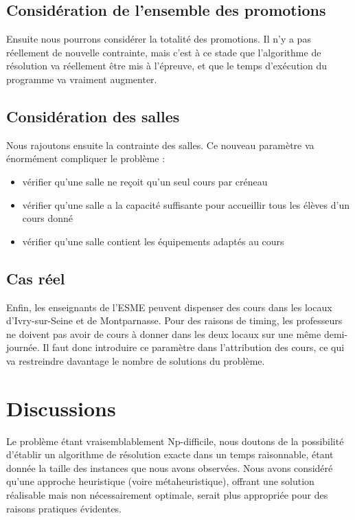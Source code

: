 \documentclass[12pt,a4paper,french]{article}
\begin{document}
\subsection{Considération de l'ensemble des promotions}
Ensuite nous pourrons considérer la totalité des promotions. Il n'y a pas réellement de nouvelle contrainte, mais c'est à ce stade que l'algorithme de résolution va réellement être mis à l'épreuve, et que le temps d'exécution du programme va vraiment augmenter.

\subsection{Considération des salles}
Nous rajoutons ensuite la contrainte des salles. Ce nouveau paramètre va énormément compliquer le problème :
\begin{itemize}
\item vérifier qu'une salle ne reçoit qu'un seul cours par créneau
\item vérifier qu'une salle a la capacité suffisante pour accueillir tous les élèves d'un cours donné
\item vérifier qu'une salle contient les équipements adaptés au cours
\end{itemize}

\subsection{Cas réel}
Enfin, les enseignants de l'ESME peuvent dispenser des cours dans les locaux d'Ivry-sur-Seine et de Montparnasse. Pour des raisons de timing, les professeurs ne doivent pas avoir de cours à donner dans les deux locaux sur une même demi-journée. Il faut donc introduire ce paramètre dans l'attribution des cours, ce qui va restreindre davantage le nombre de solutions du problème.

\newpage



\section{Discussions}

Le problème étant vraisemblablement Np-difficile, nous doutons de la possibilité d'établir un algorithme de résolution exacte dans un temps raisonnable, étant donnée la taille des instances que nous avons observées. Nous avons considéré qu'une approche heuristique (voire métaheuristique), offrant une solution réalisable mais non nécessairement optimale, serait plus appropriée pour des raisons pratiques évidentes.\\
\end{document}
